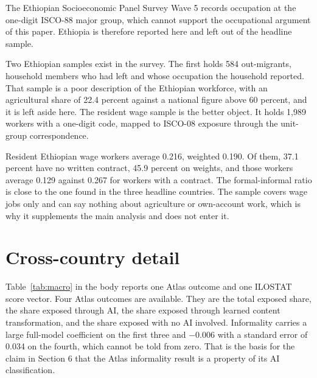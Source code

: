 The Ethiopian Socioeconomic Panel Survey Wave 5 records occupation at the
one-digit ISCO-88 major group, which cannot support the occupational argument
of this paper. Ethiopia is therefore reported here and left out of the headline
sample.

Two Ethiopian samples exist in the survey. The first holds 584 out-migrants,
household members who had left and whose occupation the household reported.
That sample is a poor description of the Ethiopian workforce, with an
agricultural share of 22.4 percent against a national figure above 60 percent,
and it is left aside here. The resident wage sample is the better object. It holds 1,989
workers with a one-digit code, mapped to ISCO-08 exposure through the unit-group
correspondence.

Resident Ethiopian wage workers average 0.216, weighted 0.190. Of them, 37.1
percent have no written contract, 45.9 percent on weights, and those workers
average 0.129 against 0.267 for workers with a contract. The formal-informal
ratio is close to the one found in the three headline countries. The sample
covers wage jobs only and can say nothing about agriculture or own-account work,
which is why it supplements the main analysis and does not enter it.

\section{Cross-country detail}
\label{app:macro}

Table~\ref{tab:macro} in the body reports one Atlas outcome and one ILOSTAT
score vector. Four Atlas outcomes are available. They are the total exposed
share, the share exposed through AI, the share exposed through learned content
transformation, and the share exposed with no AI involved. Informality carries a
large full-model coefficient on the first three and $-0.006$ with a standard
error of 0.034 on the fourth, which cannot be told from zero. That is the basis
for the claim in Section 6 that the Atlas informality result is a property of
its AI classification.

